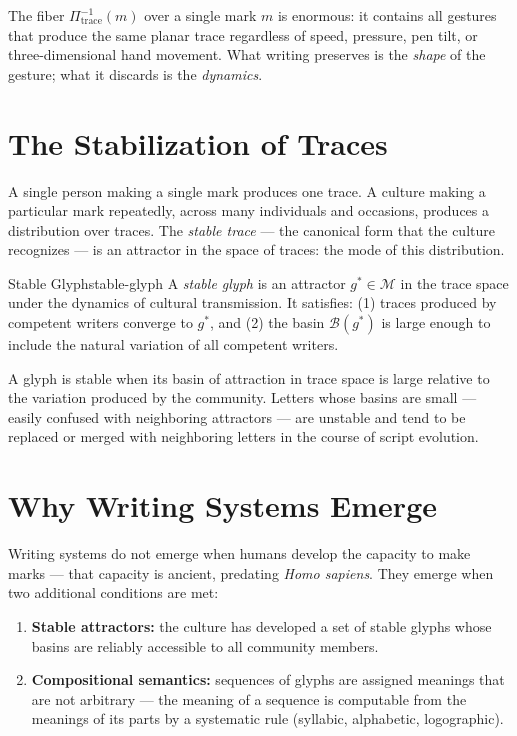 The fiber $\Pi_\text{trace}^{-1}(m)$ over a single mark $m$ is enormous:
it contains all gestures that produce the same planar trace regardless of
speed, pressure, pen tilt, or three-dimensional hand movement.
What writing preserves is the \emph{shape} of the gesture; what it
discards is the \emph{dynamics}.

\section{The Stabilization of Traces}

A single person making a single mark produces one trace. A culture
making a particular mark repeatedly, across many individuals and
occasions, produces a distribution over traces. The \emph{stable trace}
— the canonical form that the culture recognizes — is an attractor
in the space of traces: the mode of this distribution.

\begin{definition}{Stable Glyph}{stable-glyph}
  A \emph{stable glyph} is an attractor $g^* \in \mathcal{M}$ in the
  trace space under the dynamics of cultural transmission. It satisfies:
  (1) traces produced by competent writers converge to $g^*$, and
  (2) the basin $\mathcal{B}(g^*)$ is large enough to include the
  natural variation of all competent writers.
\end{definition}

A glyph is stable when its basin of attraction in trace space is
large relative to the variation produced by the community. Letters
whose basins are small — easily confused with neighboring attractors —
are unstable and tend to be replaced or merged with neighboring letters
in the course of script evolution.

\section{Why Writing Systems Emerge}

Writing systems do not emerge when humans develop the capacity to make
marks — that capacity is ancient, predating \textit{Homo sapiens}.
They emerge when two additional conditions are met:

\begin{enumerate}
  \item \textbf{Stable attractors:} the culture has developed a set of
        stable glyphs whose basins are reliably accessible to all
        community members.
  \item \textbf{Compositional semantics:} sequences of glyphs are
        assigned meanings that are not arbitrary — the meaning of a
        sequence is computable from the meanings of its parts by
        a systematic rule (syllabic, alphabetic, logographic).
\end{enumerate}

